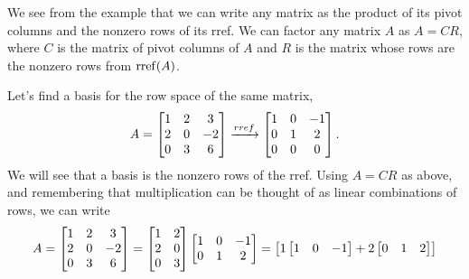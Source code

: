 We see from the example that we can write any matrix as the product of its pivot columns and the nonzero rows of its rref. We can factor any matrix $A$ as $A=CR$, where $C$ is the matrix of pivot columns of $A$ and $R$ is the matrix whose rows are the nonzero rows from $\operatorname{rref}(A)$.

\begin{example}\label{ex:row-space}
Let's find a basis for the row space of the same matrix, 
$$A=\begin{bmatrix}
\begin{matrix} 1\\2\\0 \end{matrix}
&\begin{matrix} 2\\0\\3 \end{matrix}
&\begin{matrix} 3\\-2\\6 \end{matrix}
\end{bmatrix}
\xrightarrow{rref}
\begin{bmatrix}
\begin{matrix} 1\\0\\0 \end{matrix}
&\begin{matrix} 0\\1\\0 \end{matrix}
&\begin{matrix} -1\\2\\0 \end{matrix}
\end{bmatrix}.
$$
We will see that a basis is the nonzero rows of the rref. Using $A=CR$ as above, and remembering that multiplication can be thought of as linear combinations of rows, we can write  
\begin{align*}
A
=
\begin{bmatrix}
\begin{matrix} 1\\2\\0 \end{matrix}
&\begin{matrix} 2\\0\\3 \end{matrix}
&\begin{matrix} 3\\-2\\6 \end{matrix}
\end{bmatrix}
=
\begin{bmatrix}
\begin{matrix} 1\\2\\0 \end{matrix}
&\begin{matrix} 2\\0\\3 \end{matrix}
\end{bmatrix}
\begin{bmatrix}
\begin{matrix} 1\\0 \end{matrix}
&\begin{matrix} 0\\1 \end{matrix}
&\begin{matrix} -1\\2 \end{matrix}
\end{bmatrix}
=
\begin{bmatrix}
1\begin{bmatrix}1&0&-1\end{bmatrix} + 2 \begin{bmatrix}0&1&2\end{bmatrix}\\

\end{bmatrix}
\end{align*}
\end{example}
